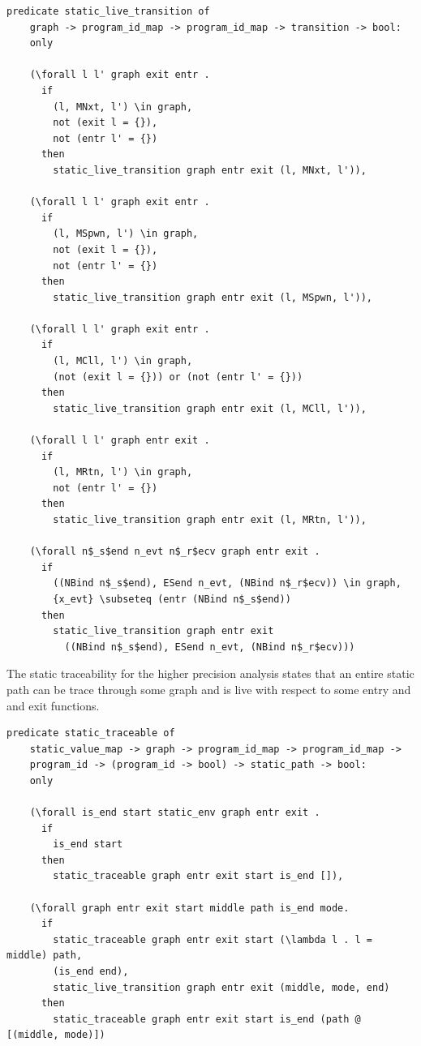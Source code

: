 \documentclass[10pt]{article}
\begin{document}
\begin{lstlisting}[language=logic, mathescape]
  predicate static_live_transition of
    graph -> program_id_map -> program_id_map -> transition -> bool:
    only

    (\forall l l' graph exit entr . 
      if
        (l, MNxt, l') \in graph,
        not (exit l = {}),
        not (entr l' = {})
      then
        static_live_transition graph entr exit (l, MNxt, l')),

    (\forall l l' graph exit entr .
      if
        (l, MSpwn, l') \in graph, 
        not (exit l = {}),
        not (entr l' = {})
      then
        static_live_transition graph entr exit (l, MSpwn, l')),

    (\forall l l' graph exit entr .
      if
        (l, MCll, l') \in graph,
        (not (exit l = {})) or (not (entr l' = {}))
      then
        static_live_transition graph entr exit (l, MCll, l')),

    (\forall l l' graph entr exit .
      if
        (l, MRtn, l') \in graph,
        not (entr l' = {})
      then
        static_live_transition graph entr exit (l, MRtn, l')),

    (\forall n$_s$end n_evt n$_r$ecv graph entr exit .
      if
        ((NBind n$_s$end), ESend n_evt, (NBind n$_r$ecv)) \in graph, 
        {x_evt} \subseteq (entr (NBind n$_s$end))
      then
        static_live_transition graph entr exit
          ((NBind n$_s$end), ESend n_evt, (NBind n$_r$ecv)))
  \end{lstlisting}

The static traceability for the higher precision analysis states
that an entire static path can be trace through some graph and
is live with respect to some entry and and exit functions.

\begin{lstlisting}[language=logic, mathescape]
  predicate static_traceable of
    static_value_map -> graph -> program_id_map -> program_id_map ->
    program_id -> (program_id -> bool) -> static_path -> bool:
    only

    (\forall is_end start static_env graph entr exit .
      if
        is_end start
      then
        static_traceable graph entr exit start is_end []),

    (\forall graph entr exit start middle path is_end mode. 
      if
        static_traceable graph entr exit start (\lambda l . l = middle) path, 
        (is_end end),
        static_live_transition graph entr exit (middle, mode, end) 
      then
        static_traceable graph entr exit start is_end (path @ [(middle, mode)])
  \end{lstlisting}
\end{document}
